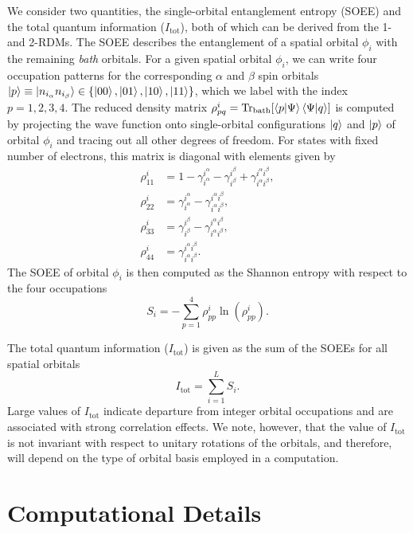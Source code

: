 \documentclass[aip,jcp,amsmath,amssymb, preprint]{revtex4-1}
\begin{document}
We consider two quantities, the single-orbital entanglement entropy (SOEE) and the total quantum information ($I_\mathrm{tot}$), both of which can be derived from the 1- and 2-RDMs.
The SOEE describes the entanglement of a spatial orbital $\phi_i$ with the remaining \textit{bath} orbitals.
For a given spatial orbital $\phi_i$, we can write four occupation patterns for the corresponding $\alpha$ and $\beta$ spin orbitals $\ket{p} \equiv \ket{n_{i_\alpha}n_{i_\beta}} \in \{\ket{00},\ket{01},\ket{10}, \ket{11}\}$, which we label with the index $p = 1,2,3,4$.
The reduced density matrix $\rho^i_{pq} = \mathrm{Tr}_\mathrm{bath} [\braket{p|\Psi}\braket{\Psi|q}]$ is computed by projecting the wave function onto single-orbital configurations $\ket{q}$ and $\ket{p}$ of orbital $\phi_i$ and tracing out all other degrees of freedom. For states with fixed number of electrons, this matrix is diagonal with elements given by
\begin{align}
\rho_{11}^i &= 1 - \gamma_{i^{\alpha}}^{i^{\alpha}} - \gamma_{i^{\beta}}^{i^{\beta}} + \gamma_{i^{\alpha} i^{\beta}}^{i^{\alpha} i^{\beta}}, \\
\rho_{22}^i &= \gamma_{i^{\alpha}}^{i^{\alpha}} - \gamma_{i^{\alpha} i^{\beta}}^{i^{\alpha} i^{\beta}}, \\
\rho_{33}^i &= \gamma_{i^{\beta} }^{i^{\beta} } - \gamma_{i^{\alpha} i^{\beta}}^{i^{\alpha} i^{\beta}}, \\
\rho_{44}^i &=\gamma_{i^{\alpha} i^{\beta} }^{i^{\alpha} i^{\beta}}.
\end{align}
The SOEE of orbital $\phi_i$ is then computed as the Shannon entropy with respect to the four occupations
\begin{equation}
S_{i} = -\sum_{p=1}^{4} \rho^{i}_{pp} \ln(\rho^{i}_{pp}).
\label{eq:soee}
\end{equation}


The total quantum information ($I_\mathrm{tot}$) is given as the sum of the SOEEs for all spatial orbitals
\begin{equation}
I_\mathrm{tot} = \sum_{i=1}^{L} S_{i}.
\end{equation}
Large values of $I_\mathrm{tot}$ indicate departure from integer orbital occupations and are associated with strong correlation effects.\cite{murg2015tree}
We note, however, that the value of $I_\mathrm{tot}$ is not invariant with respect to unitary rotations of the orbitals, and therefore, will depend on the type of orbital basis employed in a computation.

\section{\label{sec:compu_details}Computational Details}
\end{document}
